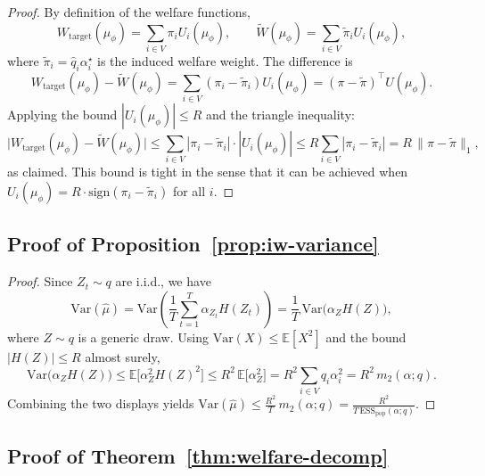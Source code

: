 \documentclass{article}
\theoremstyle{plain}
\theoremstyle{definition}
\theoremstyle{remark}
\begin{document}
\begin{proof}
By definition of the welfare functions,
\begin{equation}
    W_{\text{target}}(\mu_\phi) = \sum_{i \in V} \pi_i U_i(\mu_\phi),
    \qquad
    \widetilde{W}(\mu_\phi) = \sum_{i \in V} \tilde\pi_i U_i(\mu_\phi),
\end{equation}
where $\tilde\pi_i = \hat q_i \alpha_i^\star$ is the induced welfare weight.
The difference is
\begin{equation}
    W_{\text{target}}(\mu_\phi) - \widetilde{W}(\mu_\phi)
    =
    \sum_{i \in V} (\pi_i - \tilde\pi_i) U_i(\mu_\phi)
    =
    (\pi - \tilde\pi)^\top U(\mu_\phi).
\end{equation}
Applying the bound $|U_i(\mu_\phi)| \le R$ and the triangle inequality:
\begin{equation}
    \big|
        W_{\text{target}}(\mu_\phi) - \widetilde{W}(\mu_\phi)
    \big|
    \le
    \sum_{i \in V} |\pi_i - \tilde\pi_i| \cdot |U_i(\mu_\phi)|
    \le
    R \sum_{i \in V} |\pi_i - \tilde\pi_i|
    =
    R \, \|\pi - \tilde\pi\|_1,
\end{equation}
as claimed. This bound is tight in the sense that it can be achieved when
$U_i(\mu_\phi) = R \cdot \text{sign}(\pi_i - \tilde\pi_i)$ for all $i$.
\end{proof}

\subsection{Proof of Proposition~\ref{prop:iw-variance}}
\label{app:proof-iw-variance}

\begin{proof}
Since $Z_t \sim q$ are i.i.d., we have
\[
\mathrm{Var}(\widehat{\mu})
=
\mathrm{Var}\!\left(\frac{1}{T}\sum_{t=1}^T \alpha_{Z_t}H(Z_t)\right)
=
\frac{1}{T}\,\mathrm{Var}\!\big(\alpha_Z H(Z)\big),
\]
where $Z\sim q$ is a generic draw. Using $\mathrm{Var}(X)\le \mathbb{E}[X^2]$ and
the bound $|H(Z)|\le R$ almost surely,
\[
\mathrm{Var}\!\big(\alpha_Z H(Z)\big)
\le
\mathbb{E}\big[\alpha_Z^2 H(Z)^2\big]
\le
R^2\,\mathbb{E}\big[\alpha_Z^2\big]
=
R^2\sum_{i\in V} q_i \alpha_i^2
=
R^2\,m_2(\alpha;q).
\]
Combining the two displays yields
$\mathrm{Var}(\widehat{\mu}) \le \frac{R^2}{T}\,m_2(\alpha;q)
=\frac{R^2}{T\,\mathrm{ESS}_{\mathrm{pop}}(\alpha;q)}$.
\end{proof}

\subsection{Proof of Theorem~\ref{thm:welfare-decomp}}
\label{app:proof-welfare-decomp}
\end{document}
